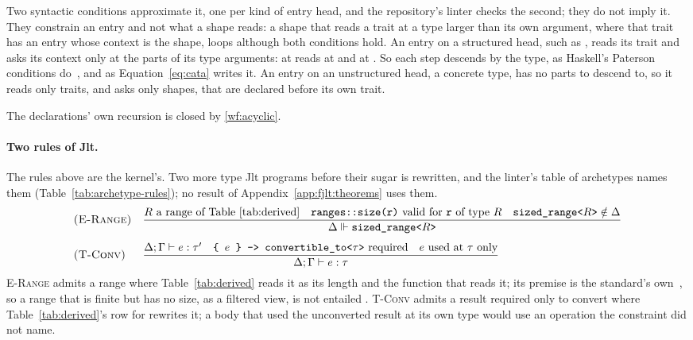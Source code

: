 Two syntactic conditions approximate it, one per kind of entry head, and the repository's linter checks the second; they do not imply it.
They constrain an entry and not what a shape reads: a shape that reads a trait at a type larger than its own argument, where that trait has an entry whose context is the shape, loops although both conditions hold.
An entry on a structured head, such as , reads its trait and asks its context only at the parts of its type arguments:  at  reads  at  and at .
So each step descends by the type, as Haskell's Paterson conditions do~\cite{sulzmann2007understanding}, and as Equation~\eqref{eq:cata} writes it.
An entry on an unstructured head, a concrete type, has no parts to descend to, so it reads only traits, and asks only shapes, that are declared before its own trait.

The declarations' own recursion is closed by \ref{wf:acyclic}.

\paragraph{Two rules of Jlt.}
\label{app:fjlt:jlt-rules}
The rules above are the kernel's.
Two more type Jlt programs before their sugar is rewritten, and the linter's table of archetypes names them (Table~\ref{tab:archetype-rules}); no result of Appendix~\ref{app:fjlt:theorems} uses them.
\[
\begin{array}{@{}l@{\quad}l@{}}
\textsc{(E-Range)} & \dfrac{R \text{ a range of Table~\ref{tab:derived}} \quad \texttt{ranges::size(r)} \text{ valid for } \texttt{r} \text{ of type } R \quad \texttt{sized\_range<}R\texttt{>} \notin \Delta}{\Delta \Vdash \texttt{sized\_range<}R\texttt{>}}
\\[14pt]
\textsc{(T-Conv)} & \dfrac{\Delta; \Gamma \vdash e : \tau' \quad \texttt{\{ }e\texttt{ \} -> convertible\_to<}\tau\texttt{>} \text{ required} \quad e \text{ used at } \tau \text{ only}}{\Delta; \Gamma \vdash e : \tau}
\end{array}
\]
\textsc{E-Range} admits a range where Table~\ref{tab:derived} reads it as its length and the function that reads it; its premise is the standard's own~\cite[{\texttt{range.sized}}]{cpp23standard}, so a range that is finite but has no size, as a filtered view, is not entailed .
\textsc{T-Conv} admits a result required only to convert where Table~\ref{tab:derived}'s row for  rewrites it; a body that used the unconverted result at its own type would use an operation the constraint did not name.
